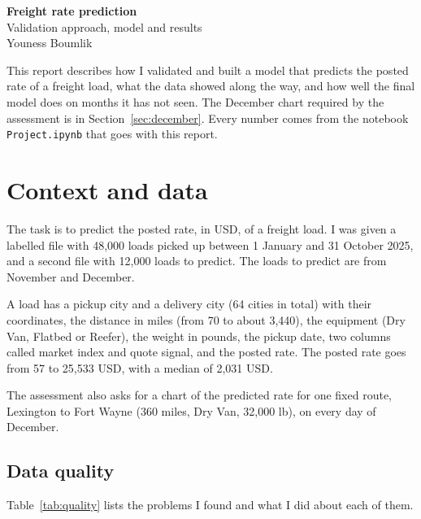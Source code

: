 \documentclass[a4paper,11pt]{article}
\begin{document}
\begin{center}
{\LARGE\bfseries Freight rate prediction}\\[6pt]
{\large Validation approach, model and results}\\[10pt]
Youness Boumlik
\end{center}

\vspace{4pt}

\noindent
This report describes how I validated and built a model that predicts the posted rate of a freight load, what the data showed along the way, and how well the final model does on months it has not seen. The December chart required by the assessment is in Section~\ref{sec:december}. Every number comes from the notebook \texttt{Project.ipynb} that goes with this report.

\section{Context and data}

The task is to predict the posted rate, in USD, of a freight load. I was given a labelled file with 48,000 loads picked up between 1 January and 31 October 2025, and a second file with 12,000 loads to predict. The loads to predict are from November and December.

A load has a pickup city and a delivery city (64 cities in total) with their coordinates, the distance in miles (from 70 to about 3,440), the equipment (Dry Van, Flatbed or Reefer), the weight in pounds, the pickup date, two columns called market index and quote signal, and the posted rate. The posted rate goes from 57 to 25,533 USD, with a median of 2,031 USD.

The assessment also asks for a chart of the predicted rate for one fixed route, Lexington to Fort Wayne (360 miles, Dry Van, 32,000 lb), on every day of December.

\subsection{Data quality}

Table~\ref{tab:quality} lists the problems I found and what I did about each of them.
\end{document}
